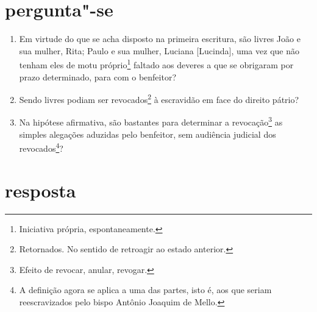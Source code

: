 \section*{pergunta"-se}

\begin{enumerate}[label=\arabic*º]
\item Em virtude do que se acha disposto na primeira escritura, são livres
João e sua mulher, Rita; Paulo e sua mulher, Luciana {[}Lucinda{]}, uma
vez que não tenham eles de motu próprio\footnote{Iniciativa própria,
  espontaneamente.} faltado aos deveres a que se obrigaram por prazo
determinado, para com o benfeitor?

\item Sendo livres podiam ser revocados\footnote{Retornados. No sentido
  de retroagir ao estado anterior.} à escravidão em face do direito
pátrio?

\item Na hipótese afirmativa, são bastantes para determinar a
revocação\footnote{Efeito de revocar, anular, revogar.} as simples
alegações aduzidas pelo benfeitor, sem audiência judicial dos
revocados\footnote{A definição agora se aplica a uma das partes, isto
  é, aos que seriam reescravizados pelo bispo Antônio Joaquim de Mello.}?
\end{enumerate}

\section*{resposta}

